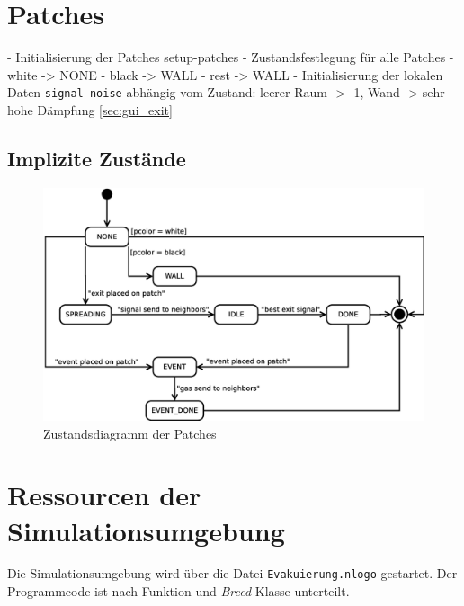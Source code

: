 \section{Patches}
\label{sec:patches}

- Initialisierung der Patches setup-patches
 - Zustandsfestlegung für alle Patches 
  - white -> NONE
  - black -> WALL
  - rest -> WALL
 - Initialisierung der lokalen Daten \verb|signal-noise| abhängig vom Zustand: leerer Raum -> -1, Wand -> sehr hohe Dämpfung \ref{sec:gui_exit} 


\subsection{Implizite Zustände}
\label{sec:patch_states}




\begin{figure}
\centering
\includegraphics[height=0.6\textwidth]{simulationsumgebung/patch.eps}
\caption{Zustandsdiagramm der Patches}
\label{fig:patch}
\end{figure}

\section{Ressourcen der Simulationsumgebung}
\label{sec:ressourcen}

Die Simulationsumgebung wird über die Datei \verb|Evakuierung.nlogo| gestartet. Der Programmcode ist nach Funktion und \emph{Breed}-Klasse unterteilt.

